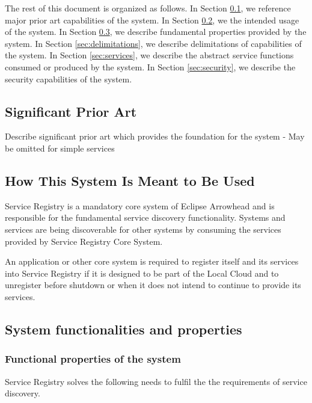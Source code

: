 \documentclass[a4paper]{arrowhead}
\begin{document}
The rest of this document is organized as follows.
In Section \ref{sec:prior_art}, we reference major prior art capabilities
of the system.
In Section \ref{sec:use}, we the intended usage of the system.
In Section \ref{sec:properties}, we describe fundamental properties
provided by the system.
In Section \ref{sec:delimitations}, we describe delimitations of capabilities
of the system.
In Section \ref{sec:services}, we describe the abstract service
functions consumed or produced by the system.
In Section \ref{sec:security}, we describe the security capabilities
of the system.

\newpage

\subsection{Significant Prior Art}
\label{sec:prior_art}

\color{red}
Describe significant prior art which provides the
foundation for the system - May be omitted for simple services
\color{black}  

\subsection{How This System Is Meant to Be Used}
\label{sec:use}

Service Registry is a mandatory core system of Eclipse Arrowhead and is responsible for the fundamental service discovery functionality. Systems and services are being discoverable for other systems by consuming the services provided by Service Registry Core System.

An application or other core system is required to register itself and its services into Service Registry if it is designed to be part of the Local Cloud and to unregister before shutdown or when it does not intend to continue to provide its services.

\subsection{System functionalities and properties}
\label{sec:properties}

\subsubsection {Functional properties of the system}
Service Registry solves the following needs to fulfil the the requirements of service discovery.
\end{document}
